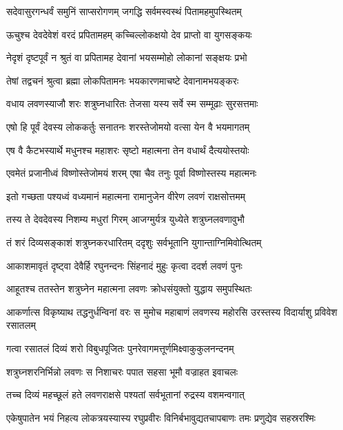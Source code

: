 \twolineshloka
{सदेवासुरगन्धर्वं समुनिं साप्सरोगणम्}
{जगद्धि सर्वमस्वस्थं पितामहमुपस्थितम्} %

\twolineshloka
{ऊचुश्च देवदेवेशं वरदं प्रपितामहम्}
{कच्चिल्लोकक्षयो देव प्राप्तो वा युगसङ्कयः} %

\twolineshloka
{नेदृशं दृष्टपूर्वं न श्रुतं वा प्रपितामह}
{देवानां भयसम्मोहो लोकानां सङ्क्षयः प्रभो} %

\twolineshloka
{तेषां तद्वचनं श्रुत्वा ब्रह्मा लोकपितामनः}
{भयकारणमाचष्टे देवानामभयङ्करः} %

\twolineshloka
{वधाय लवणस्याजौ शरः शत्रुघ्नधारितः}
{तेजसा यस्य सर्वे स्म सम्मूढाः सुरसत्तमाः} %

\twolineshloka
{एषो हि पूर्वं देवस्य लोककर्तुः सनातनः}
{शरस्तेजोमयो वत्सा येन वै भयमागतम्} %

\twolineshloka
{एष वै कैटभस्यार्थे मधुनश्च महाशरः}
{सृष्टो महात्मना तेन वधार्थं दैत्ययोस्तयोः} %

\twolineshloka
{एवमेतं प्रजानीध्वं विष्णोस्तेजोमयं शरम्}
{एषा चैव तनुः पूर्वा विष्णोस्तस्य महात्मनः} %

\twolineshloka
{इतो गच्छता पश्यध्वं वध्यमानं महात्मना}
{रामानुजेन वीरेण लवणं राक्षसोत्तमम्} %

\twolineshloka
{तस्य ते देवदेवस्य निशम्य मधुरां गिरम्}
{आजग्मुर्यत्र युध्येते शत्रुघ्नलवणावुभौ} %

\twolineshloka
{तं शरं दिव्यसङ्काशं शत्रुघ्नकरधारितम्}
{ददृशुः सर्वभूतानि युगान्ताग्निमिवोत्थितम्} %

\twolineshloka
{आकाशमावृतं दृष्ट्वा देवैर्हि रघुनन्दनः}
{सिंहनादं मुहुः कृत्वा ददर्श लवणं पुनः} %

\twolineshloka
{आहूतश्च ततस्तेन शत्रुघ्नेन महात्मना}
{लवणः क्रोधसंयुक्तो युद्धाय समुपस्थितः} %

\threelineshloka
{आकर्णात्स विकृष्याथ तद्धनुर्धन्विनां वरः}
{स मुमोच महाबाणं लवणस्य महोरसि}
{उरस्तस्य विदार्याशु प्रविवेश रसातलम्} %

\twolineshloka
{गत्वा रसातलं दिव्यं शरो विबुधपूजितः}
{पुनरेवागमत्तूर्णमिक्ष्वाकुकुलनन्दनम्} %

\twolineshloka
{शत्रुघ्नशरनिर्भिन्नो लवणः स निशाचरः}
{पपात सहसा भूमौ वज्राहत इवाचलः} %

\twolineshloka
{तच्च दिव्यं महच्छूलं हते लवणराक्षसे}
{पश्यतां सर्वभूतानां रुद्रस्य वशमन्वगात्} %

\fourlineindentedshloka
{एकेषुपातेन भयं निहत्य}
{लोकत्रयस्यास्य रघुप्रवीरः}
{विनिर्बभावुद्यतचापबाणः}
{तमः प्रणुद्येव सहस्ररश्मिः} %


